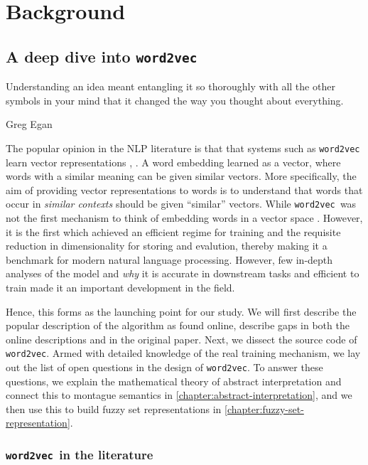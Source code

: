 \documentclass[11pt]{book}
\newcommand{\wtov}{\texttt{word2vec }}
\begin{document}
\chapter{Background}
\section{A deep dive into \wtov}
\label{chapter:deep-dive-wtov}

\epigraph{Understanding an idea meant entangling it so thoroughly with all the
other symbols in your mind that it changed the way you thought about
everything.}{Greg Egan}

The popular opinion in the NLP literature
is that that systems such as \texttt{word2vec} learn
vector representations \cite{levy2014neural}, \cite{pennington2014glove}.  A word
embedding learned as a vector, where words with a similar meaning can be given
similar vectors. More specifically, the aim of providing vector representations
to words is to understand that words that occur in \textit{similar contexts}
should be given ``similar'' vectors. While \wtov was not the first mechanism to
think of embedding words in a vector space
\cite{baroni2010distributional,bruni2012distributional}. However, it is the
first which achieved an efficient regime for training and the requisite
reduction in dimensionality for storing and evalution, thereby making it a
benchmark for modern natural language processing. However, few in-depth analyses
of the model and \textit{why} it is accurate in downstream tasks and efficient
to train made it an important development in the field.


Hence, this forms as the launching point for our study. We will
first describe the popular description of the algorithm as found online, describe
gaps in both the online descriptions and in the original paper. Next, we dissect the
source code of \texttt{word2vec}. Armed with detailed knowledge of the real
training mechanism, we lay out the list of open questions in the design of
\texttt{word2vec}. 
To answer these questions, we explain the mathematical
theory of abstract interpretation and connect this to montague semantics in
\autoref{chapter:abstract-interpretation}, and we then use this to build fuzzy
set representations in \autoref{chapter:fuzzy-set-representation}.

\subsection{\wtov in the literature}
\end{document}
